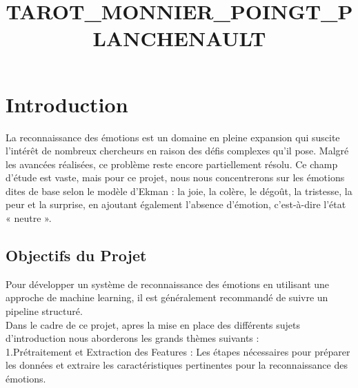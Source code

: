 \documentclass{rapport}
\title{TAROT_MONNIER_POINGT_PLANCHENAULT} %
\begin{document}





\fairemarges %
\fairepagedegarde %
\tabledematieres %


\section{Introduction}

La reconnaissance des émotions est un domaine en pleine expansion qui suscite l'intérêt de
nombreux chercheurs en raison des défis complexes qu'il pose.
Malgré les avancées réalisées, ce problème reste encore partiellement résolu.
Ce champ d'étude est vaste, mais pour ce projet, nous nous concentrerons sur les émotions dites de base selon le modèle d'Ekman :
la joie, la colère, le dégoût, la tristesse, la peur et la surprise, en ajoutant également l'absence d'émotion,
c'est-à-dire l'état « neutre ».\\

\subsection{Objectifs du Projet}
Pour développer un système de reconnaissance des émotions en utilisant une approche de machine learning,
il est généralement recommandé de suivre un pipeline structuré.\\

Dans le cadre de ce projet, apres la mise en place des différents sujets d'introduction nous aborderons les grands thèmes suivants :\\

1.Prétraitement et Extraction des Features :
Les étapes nécessaires pour préparer les données et extraire les caractéristiques pertinentes pour la reconnaissance des émotions.\\
\end{document}
